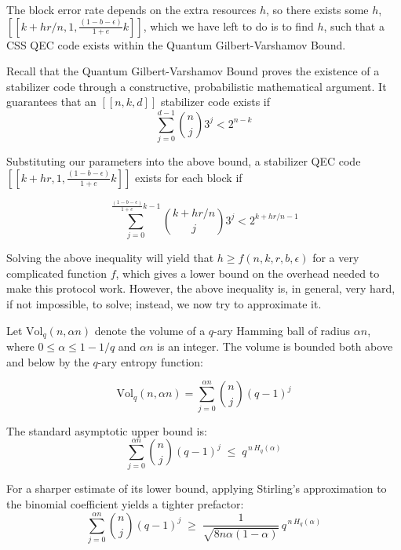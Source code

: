 \documentclass[%
 reprint,
superscriptaddress,
 amsmath,amssymb,
 aps,
]{revtex4-2}
\begin{document}
The block error rate depends on the extra resources $h$, so there exists some $h$, $[[k+hr/n, 1, \frac{(1-b-\epsilon)}{1+e}k]]$, which we have left to do is to find $h$, such that a CSS QEC code exists within the Quantum Gilbert-Varshamov Bound.

Recall that the Quantum Gilbert-Varshamov Bound proves the existence of a stabilizer code through a constructive, probabilistic mathematical argument. It guarantees that an $[[n, k, d]]$ stabilizer code exists if 
\begin{equation}
    \sum_{j=0}^{d-1}\binom{n}{j}3^j <2^{n-k}
\end{equation}

Substituting our parameters into the above bound, a stabilizer QEC code $[[k+hr, 1, \frac{(1-b-\epsilon)}{1+e}k]]$ exists for each block if

\begin{equation}
    \sum_{j=0}^{\frac{(1-b-\epsilon)}{1+e}k-1}\binom{k+hr/n}{j}3^j <2^{k+hr/n-1}
\end{equation}

Solving the above inequality will yield that $h\ge f(n, k, r, b,\epsilon)$ for a very complicated function $f$, which gives a lower bound on the overhead needed to make this protocol work. However, the above inequality is, in general, very hard, if not impossible, to solve; instead, we now try to approximate it.

Let $\text{Vol}_q(n, \alpha n)$ denote the volume of a $q$-ary Hamming ball of radius $\alpha n$, where $0 \le \alpha \le 1 - 1/q$ and $\alpha n$ is an integer. The volume is bounded both above and below by the $q$-ary entropy function:

\begin{equation}
    \text{Vol}_q(n, \alpha n) = \sum_{j=0}^{\alpha n} \binom{n}{j}(q-1)^j
\end{equation}

The standard asymptotic upper bound is:
\begin{equation}
    \sum_{j=0}^{\alpha n} \binom{n}{j}(q-1)^j \;\leq\; q^{\,n\,H_q(\alpha)}
\end{equation}

For a sharper estimate of its lower bound, applying Stirling's approximation to the binomial coefficient yields a tighter prefactor:
\begin{equation}
    \sum_{j=0}^{\alpha n} \binom{n}{j}(q-1)^j \;\geq\; \frac{1}{\sqrt{8 n \alpha(1-\alpha)}} \, q^{\,n\,H_q(\alpha)}
\end{equation}
\end{document}

